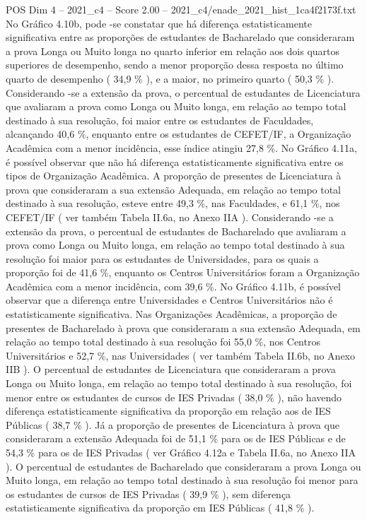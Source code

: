 \begin{textsample}{POS Dim 4 – 2021\_c4 – Score 2.00 – 2021\_c4/enade\_2021\_hist\_1ca4f2173f.txt}
No Gráfico 4.10b, pode -se constatar que há diferença estatisticamente significativa entre as proporções de estudantes de Bacharelado que consideraram a prova Longa ou Muito longa no quarto inferior em relação aos dois quartos superiores de desempenho, sendo a menor proporção dessa resposta no último quarto de desempenho ( 34,9 \% ), e a maior, no primeiro quarto ( 50,3 \% ).
Considerando -se a extensão da prova, o percentual de estudantes de Licenciatura que avaliaram a prova como Longa ou Muito longa, em relação ao tempo total destinado à sua resolução, foi maior entre os estudantes de Faculdades, alcançando 40,6 \%, enquanto entre os estudantes de CEFET/IF, a Organização Acadêmica com a menor incidência, esse índice atingiu 27,8 \%.
No Gráfico 4.11a, é possível observar que não há diferença estatisticamente significativa entre os tipos de Organização Acadêmica.
A proporção de presentes de Licenciatura à prova que consideraram a sua extensão Adequada, em relação ao tempo total destinado à sua resolução, esteve entre 49,3 \%, nas Faculdades, e 61,1 \%, nos CEFET/IF ( ver também Tabela II.6a, no Anexo IIA ).
Considerando -se a extensão da prova, o percentual de estudantes de Bacharelado que avaliaram a prova como Longa ou Muito longa, em relação ao tempo total destinado à sua resolução foi maior para os estudantes de Universidades, para os quais a proporção foi de 41,6 \%, enquanto os Centros Universitários foram a Organização Acadêmica com a menor incidência, com 39,6 \%.
No Gráfico 4.11b, é possível observar que a diferença entre Universidades e Centros Universitários não é estatisticamente significativa.
Nas Organizações Acadêmicas, a proporção de presentes de Bacharelado à prova que consideraram a sua extensão Adequada, em relação ao tempo total destinado à sua resolução foi 55,0 \%, nos Centros Universitários e 52,7 \%, nas Universidades ( ver também Tabela II.6b, no Anexo IIB ).
O percentual de estudantes de Licenciatura que consideraram a prova Longa ou Muito longa, em relação ao tempo total destinado à sua resolução, foi menor entre os estudantes de cursos de IES Privadas ( 38,0 \% ), não havendo diferença estatisticamente significativa da proporção em relação aos de IES Públicas ( 38,7 \% ).
Já a proporção de presentes de Licenciatura à prova que consideraram a extensão Adequada foi de 51,1 \% para os de IES Públicas e de 54,3 \% para os de IES Privadas ( ver Gráfico 4.12a e Tabela II.6a, no Anexo IIA ).
O percentual de estudantes de Bacharelado que consideraram a prova Longa ou Muito longa, em relação ao tempo total destinado à sua resolução foi menor para os estudantes de cursos de IES Privadas ( 39,9 \% ), sem diferença estatisticamente significativa da proporção em IES Públicas ( 41,8 \% ).

\end{textsample}
